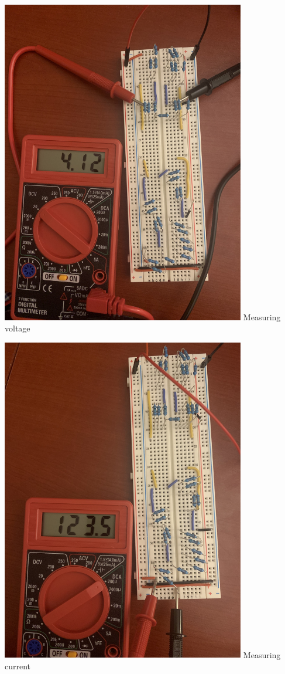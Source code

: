 \documentclass[12pt]{article}
\begin{document}
\begin{center}
	\includegraphics[width=0.8\textwidth]{res/IMG_0150.jpg}
	\newline
	Measuring voltage
\end{center}
\begin{center}
	\includegraphics[width=0.8\textwidth]{res/IMG_0151.jpg}
	\newline
	Measuring current
\end{center}
\end{document}
